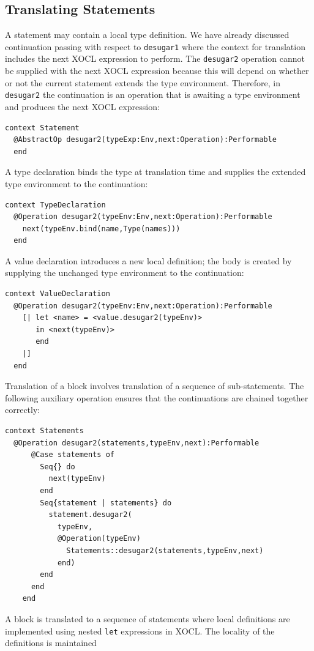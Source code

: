 \documentclass{article}
\begin{document}
\subsection{Translating Statements}

A statement may contain a local type definition. We have already discussed continuation
passing with respect to {\tt desugar1} where the context for translation includes the
next XOCL expression to perform. The {\tt desugar2} operation cannot be supplied with the
next XOCL expression because this will depend on whether or not the current statement
extends the type environment. Therefore, in {\tt desugar2} the continuation is an operation
that is awaiting a type environment and produces the next XOCL expression:
\begin{verbatim}
context Statement
  @AbstractOp desugar2(typeExp:Env,next:Operation):Performable
  end
\end{verbatim}
A type declaration binds the type at translation time and supplies the extended type
environment to the continuation:
\begin{verbatim}
context TypeDeclaration
  @Operation desugar2(typeEnv:Env,next:Operation):Performable
    next(typeEnv.bind(name,Type(names)))
  end
\end{verbatim}
A value declaration introduces a new local definition; the body is created by
supplying the unchanged type environment to the continuation:
\begin{verbatim}
context ValueDeclaration
  @Operation desugar2(typeEnv:Env,next:Operation):Performable
    [| let <name> = <value.desugar2(typeEnv)> 
       in <next(typeEnv)> 
       end 
    |]
  end
\end{verbatim}
Translation of a block involves translation of a sequence of sub-statements. The following
auxiliary operation ensures that the continuations are chained together correctly:
\begin{verbatim}
context Statements
  @Operation desugar2(statements,typeEnv,next):Performable
      @Case statements of
        Seq{} do 
          next(typeEnv)
        end
        Seq{statement | statements} do 
          statement.desugar2(
            typeEnv,
            @Operation(typeEnv)
              Statements::desugar2(statements,typeEnv,next)
            end) 
        end
      end
    end
\end{verbatim}
A block is translated to a sequence of statements where local definitions are implemented
using nested {\tt let} expressions in XOCL. The locality of the definitions is maintained
\end{document}

